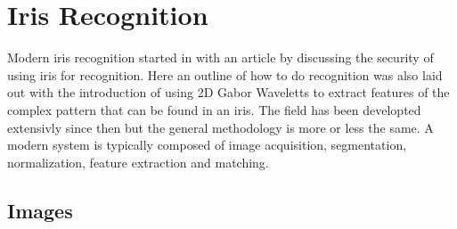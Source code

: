 \section{Iris Recognition}
\label{sec:Iris_Recognition_Research}
Modern iris recognition started in with an article by \cite{Daugman1993} discussing the security of using iris for recognition. Here an outline of how to do recognition was also laid out with the introduction of using  2D Gabor Waveletts to extract features of the complex pattern that can be found in an iris. The field has been developted extensivly since then but the general methodology is more or less the same. A modern system is typically composed of image acquisition, segmentation, normalization, feature extraction and matching. 

\subsection{Images}
